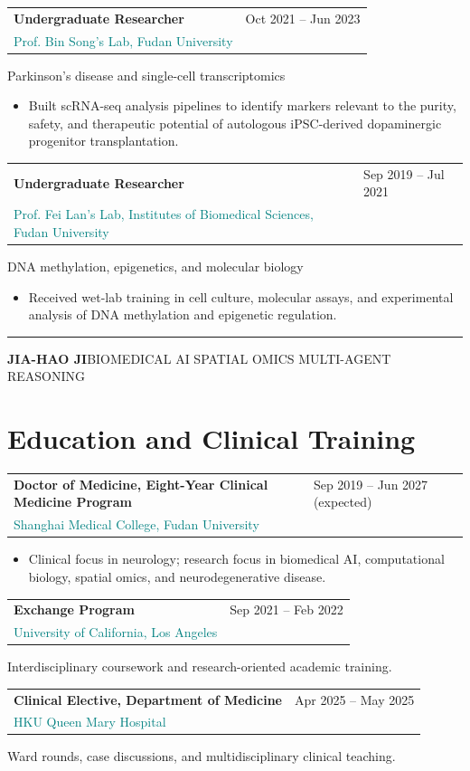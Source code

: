 \documentclass[10pt,a4paper]{article}
\makeatletter
\newcommand{\roleline}[3]{%
  \begin{tabularx}{\textwidth}{@{}>{\RaggedRight\arraybackslash}X>{\RaggedLeft\arraybackslash}p{32mm}@{}}
    \textbf{#1} & \textcolor{Muted}{#3}\\[-0.1em]
    \textcolor{Teal}{#2} &
  \end{tabularx}
}
\newcommand{\meta}[1]{{\small\color{Muted}#1}}
\newcommand{\cvitem}[1]{\item {#1}}
\newenvironment{cvitems}{%
  \begin{itemize}[leftmargin=1.15em,itemsep=0.17em,topsep=0.25em,parsep=0pt,partopsep=0pt,label=\textcolor{Teal}{\raisebox{0.15ex}{\scriptsize\textbullet}}]
}{\end{itemize}}
\makeatother
\begin{document}
\vspace{0.3em}
\roleline{Undergraduate Researcher}{Prof. Bin Song's Lab, Fudan University}{Oct 2021 -- Jun 2023}
\meta{Parkinson's disease and single-cell transcriptomics}
\begin{cvitems}
  \cvitem{Built scRNA-seq analysis pipelines to identify markers relevant to the purity, safety, and therapeutic potential of autologous iPSC-derived dopaminergic progenitor transplantation.}
\end{cvitems}

\vspace{0.24em}
\roleline{Undergraduate Researcher}{Prof. Fei Lan's Lab, Institutes of Biomedical Sciences, Fudan University}{Sep 2019 -- Jul 2021}
\meta{DNA methylation, epigenetics, and molecular biology}
\begin{cvitems}
  \cvitem{Received wet-lab training in cell culture, molecular assays, and experimental analysis of DNA methylation and epigenetic regulation.}
\end{cvitems}

\newpage
\noindent\color{Navy}\rule{\textwidth}{2.2pt}
\vspace{0.55em}
{\small\bfseries\color{Navy}JIA-HAO JI}\hfill{\small\color{Muted}BIOMEDICAL AI \textbar{} SPATIAL OMICS \textbar{} MULTI-AGENT REASONING}\par

\section*{Education and Clinical Training}

\roleline{Doctor of Medicine, Eight-Year Clinical Medicine Program}{Shanghai Medical College, Fudan University}{Sep 2019 -- Jun 2027 (expected)}
\begin{cvitems}
  \cvitem{Clinical focus in neurology; research focus in biomedical AI, computational biology, spatial omics, and neurodegenerative disease.}
\end{cvitems}

\vspace{0.28em}
\roleline{Exchange Program}{University of California, Los Angeles}{Sep 2021 -- Feb 2022}
\meta{Interdisciplinary coursework and research-oriented academic training.}

\vspace{0.22em}
\roleline{Clinical Elective, Department of Medicine}{HKU Queen Mary Hospital}{Apr 2025 -- May 2025}
\meta{Ward rounds, case discussions, and multidisciplinary clinical teaching.}
\end{document}
